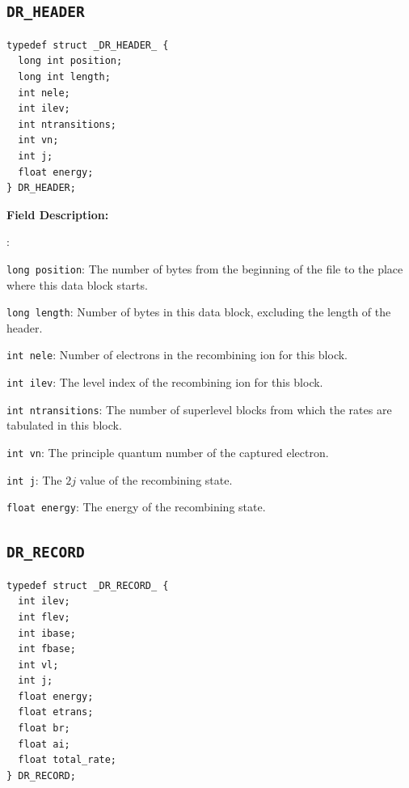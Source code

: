 \documentclass[twoside,letterpaper]{refrep}
\newenvironment{dbdesc}{\textbf{Field Description:} \begin{list}
	{:}{\setlength{\labelwidth}{2in}
	   \setlength{\leftmargin}{2in}
	   \setlength{\labelsep}{0.1in}
	   \setlength{\rightmargin}{0.2in}}}
	{\end{list}}
\begin{document}
\subsection{\texttt{DR\_HEADER}}
\begin{verbatim}	
typedef struct _DR_HEADER_ {
  long int position;
  long int length;
  int nele;
  int ilev;
  int ntransitions;
  int vn;
  int j;
  float energy;
} DR_HEADER;
\end{verbatim}

\begin{dbdesc}
\item[\texttt{long position}:] The number of bytes from the beginning of the
file to the place where this data block starts.
\item[\texttt{long length}:] Number of bytes in this data block, excluding the
length of the header.
\item[\texttt{int nele}:] Number of electrons in the recombining ion for this
block. 
\item[\texttt{int ilev}:] The level index of the recombining ion for this
block. 
\item[\texttt{int ntransitions}:] The number of superlevel blocks from which
the rates are tabulated in this block.
\item[\texttt{int vn}:] The principle quantum number of the captured electron.
\item[\texttt{int j}:] The $2j$ value of the recombining state.
\item[\texttt{float energy}:] The energy of the recombining state.
\end{dbdesc}

\subsection{\texttt{DR\_RECORD}}
\begin{verbatim}
typedef struct _DR_RECORD_ {
  int ilev;
  int flev;
  int ibase;
  int fbase;
  int vl;
  int j;
  float energy;
  float etrans;
  float br;
  float ai;
  float total_rate;
} DR_RECORD;
\end{verbatim}
\end{document}
